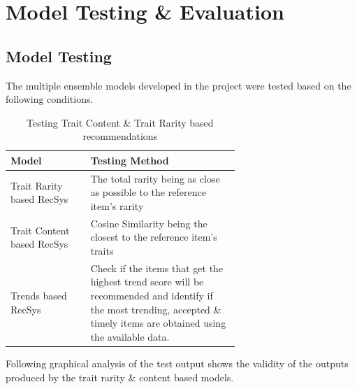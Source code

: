\section{Model Testing \& Evaluation}

\subsection{Model Testing}


The multiple ensemble models developed in the project were tested based on the following conditions.

\begin{longtable}[h!]{|l|p{0.65\linewidth}|}
\caption{Testing Trait Content \& Trait Rarity based recommendations}
\endfirsthead
\hline
\textbf{Model} & \textbf{Testing Method} \\
\hline
Trait Rarity based RecSys & The total rarity being as close as possible to the reference item's rarity\\
\hline
Trait Content based RecSys & Cosine Similarity being the closest to the reference item's traits\\
\hline
Trends based RecSys & Check if the items that get the highest trend score will be recommended and identify if the most trending, accepted \& timely items are obtained using the available data. \\
\hline
\end{longtable}

\noindent Following graphical analysis of the test output shows the validity of the outputs produced by the trait rarity \& content based models.


